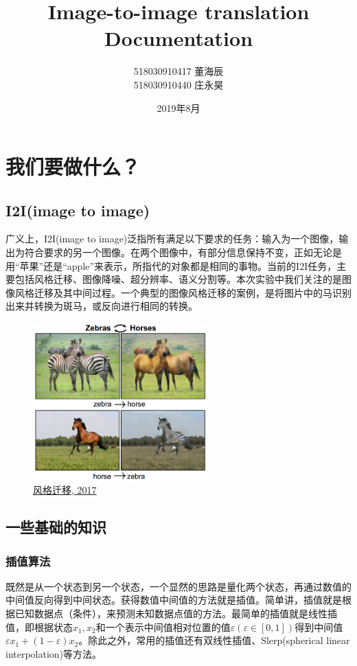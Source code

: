 \documentclass[UTF8,a4paper，12pt]{article}
\title{Image-to-image translation Documentation}
\author{518030910417 董海辰 \\ 518030910440 庄永昊}
\date{2019年8月}
\def\eps {\varepsilon}
\theoremstyle{theorem}
\theoremstyle{definition}
\begin{document}
	\maketitle
	\newpage
	\tableofcontents
	\newpage
	
	\section{我们要做什么？}
		\subsection{I2I(image to image)}
		
广义上，I2I(image to image)泛指所有满足以下要求的任务：输入为一个图像，输出为符合要求的另一个图像。在两个图像中，有部分信息保持不变，正如无论是用“苹果”还是“apple”来表示，所指代的对象都是相同的事物。当前的I2I任务，主要包括风格迁移、图像降噪、超分辨率、语义分割等。本次实验中我们关注的是图像风格迁移及其中间过程。一个典型的图像风格迁移的案例，是将图片中的马识别出来并转换为斑马，或反向进行相同的转换。

\begin{figure}[htbp]
	\centering
	\includegraphics[width=0.6\textwidth]{assets/01}
	\caption{\href{https://arxiv.org/abs/1703.10593}{风格迁移, 2017}}
\end{figure}

		\subsection{一些基础的知识}
\subsubsection{插值算法}

既然是从一个状态到另一个状态，一个显然的思路是量化两个状态，再通过数值的中间值反向得到中间状态。获得数值中间值的方法就是插值。简单讲，插值就是根据已知数据点（条件），来预测未知数据点值的方法。最简单的插值就是线性插值，即根据状态$x_1, x_2$和一个表示中间值相对位置的值$\eps ( \eps \in [0, 1])$得到中间值$\eps x_1+(1-\eps)x_2$。除此之外，常用的插值还有双线性插值、Slerp(spherical linear interpolation)等方法。
\end{document}
